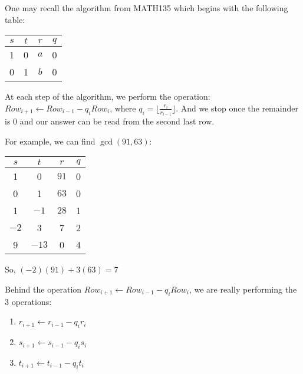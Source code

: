 \begin{example}{}{}
    One may recall the algorithm from MATH135 which begins with the following table:

    \begin{center}
        \begin{tabular}{|c|c|c|c|}
            \hline
            $s$ & $t$ & $r$ & $q$ \\
            \hline 
            1 & 0 & $a$ & 0 \\
            \hline
            0 & 1 & $b$ & 0 \\
            \hline
        \end{tabular}
    \end{center}

    At each step of the algorithm, we perform the operation: $Row_{i + 1} \leftarrow Row_{i - 1} - q_iRow_i$, where $q_i = \lfloor \frac{r_i}{r_{i - 1}} \rfloor$.
    And we stop once the remainder is $0$ and our answer can be read from the second last row.

    For example, we can find $\gcd(91, 63)$:
    \begin{center}
        \begin{tabular}{|c|c|c|c|}
            \hline
            $s$ & $t$ & $r$ & $q$ \\
            \hline 
            1 & 0 & $91$ & 0 \\
            \hline
            0 & 1 & $63$ & 0 \\
            \hline
            1 & $-1$ & $28$ & 1 \\
            \hline
            $-2$ & 3 & 7 & 2 \\
            \hline
            9 & $-13$ & 0 & 4 \\
            \hline
        \end{tabular}
    \end{center}
    So, $(-2)(91) + 3(63) = 7$
\end{example}

\begin{note}
    Behind the operation $Row_{i + 1} \leftarrow Row_{i - 1} - q_iRow_i$, we are really performing the $3$ operations:
    \begin{enumerate}
        \item $r_{i + 1} \leftarrow r_{i - 1} - q_ir_i$
        \item $s_{i + 1} \leftarrow s_{i - 1} - q_is_i$
        \item $t_{i + 1} \leftarrow t_{i - 1} - q_it_i$
    \end{enumerate}
\end{note}


